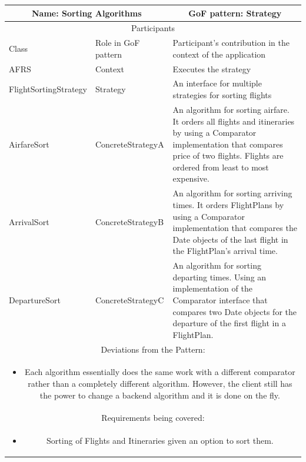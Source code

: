 \begin{center}
    \begin{tabular}{ |p{4cm}|p{4cm}|p{7cm}|  }
        \hline
        \multicolumn{2}{|c|}{Name: Sorting Algorithms} & \multicolumn{1}{|c|}{GoF pattern: Strategy} \\
        \hline
        \multicolumn{3}{|c|}{Participants} \\
        \hline
        Class & Role in GoF pattern & Participant's contribution in the context of the application \\
        \hline \hline

        AFRS & Context & Executes the strategy \\
        \hline
        FlightSortingStrategy & Strategy & An interface for multiple strategies for sorting flights \\
        \hline
        AirfareSort & ConcreteStrategyA & An algorithm for sorting airfare.
        It orders all flights and itineraries by using a Comparator implementation that compares price of two flights.
        Flights are ordered from least to most expensive. \\
        \hline
        ArrivalSort & ConcreteStrategyB & An algorithm for sorting arriving times.
        It orders FlightPlans by using a Comparator implementation that compares the Date objects of the last flight in the FlightPlan’s arrival time.  \\
        \hline
        DepartureSort & ConcreteStrategyC & An algorithm for sorting departing times.
        Using an implementation of the Comparator interface that compares two Date objects for the departure of the first flight in a FlightPlan.  \\
        \hline

        \hline
        \multicolumn{3}{|c|}{Deviations from the Pattern:} \\ \multicolumn{3}{|c|}{\parbox{0.9\textwidth}{
        \begin{itemize}
            \item Each algorithm essentially does the same work with a different comparator rather than a completely different algorithm.
            However, the client still has the power to change a backend algorithm and it is done on the fly.
        \end{itemize} }} \\
        \hline
        \multicolumn{3}{|c|}{Requirements being covered:} \\ \multicolumn{3}{|c|}{\parbox{0.9\textwidth}{
        \begin{itemize}
            \item Sorting of Flights and Itineraries given an option to sort them.
        \end{itemize} }} \\
        \hline
    \end{tabular}
\end{center}

